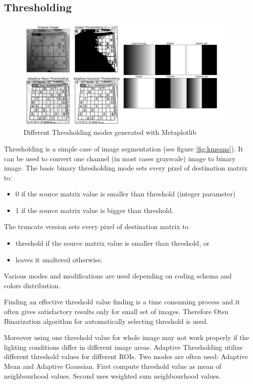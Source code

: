 \documentclass[12pt,twoside,a4paper]{article}
\begin{document}
\subsection{Thresholding}
\begin{figure}[H]
\centering
\includegraphics[width=0.8\paperwidth]{oneth}
\caption{Different Thresholding modes generated with Metaplotlib}\label{fig:thr}
\end{figure}
Thresholding is a simple case of image segmentation (see figure \ref{fig:kmeans}).
It can be used to convert one channel (in most cases grayscale) image to binary image.
\newpage
The basic binary thresholding mode sets every pixel of destination matrix to:
\begin{itemize}
\item 0 if the source matrix value is smaller than threshold (integer parameter)
\item 1 if the source matrix value is bigger than threshold.
\end{itemize}
The truncate version sets every pixel of destination matrix to
\begin{itemize}
\item threshold if the source matrix value is smaller than threshold, or
\item leaves it unaltered otherwise.
\end{itemize}
Various modes and modifications are used depending on coding schema and colors distribution.
  



Finding an effective threshold value finding is a time consuming process and it often gives satisfactory results only for small set of images.
Therefore Otsu Binarization algorithm for automatically selecting threshold is used.

Moreover using one threshold value for whole image may not work properly if the lighting conditions differ in different image areas.\cite{thre}
Adaptive Thresholding utilize different threshold values for different ROIs.
Two modes are often used: Adaptive Mean and Adaptive Gaussian.
First compute threshold value as mean of neighbourhood values.
Second uses weighted sum neighbourhood values.
\end{document}
